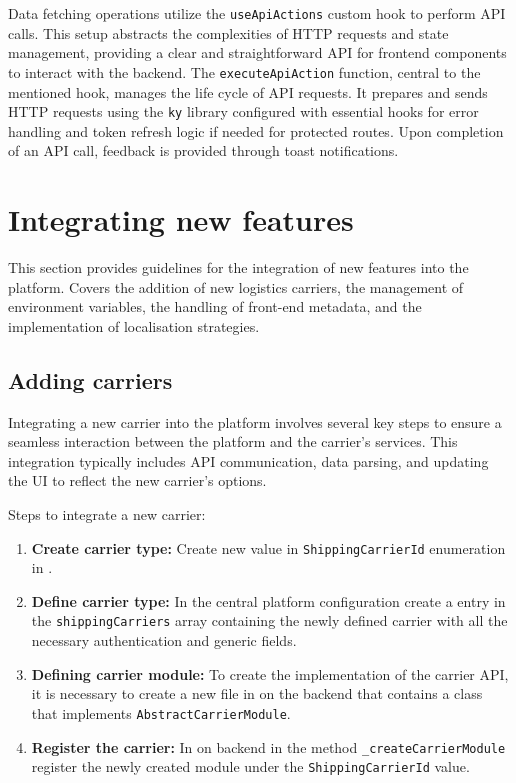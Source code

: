 Data fetching operations utilize the \texttt{useApiActions} custom hook to perform API calls. 
This setup abstracts the complexities of HTTP requests and state management, providing a clear and straightforward API for frontend components to interact with the backend.
The \texttt{executeApiAction} function, central to the mentioned hook, manages the life cycle of API requests. It prepares and sends HTTP requests using the \texttt{ky} library configured with essential hooks for error handling and token refresh logic if needed for protected routes.
Upon completion of an API call, feedback is provided through toast notifications.

\section{Integrating new features}
\label{attachments:programming-platform.integrating}
This section provides guidelines for the integration of new features into the platform. 
Covers the addition of new logistics carriers, the management of environment variables, the handling of front-end metadata, and the implementation of localisation strategies.

\subsection{Adding carriers}
Integrating a new carrier into the platform involves several key steps to ensure a seamless interaction between the platform and the carrier's services. 
This integration typically includes API communication, data parsing, and updating the UI to reflect the new carrier's options.

Steps to integrate a new carrier:
\begin{enumerate}
    \item \textbf{Create carrier type:} Create new value in \texttt{ShippingCarrierId} enumeration in .
    \item \textbf{Define carrier type:} In the central platform configuration  create a entry in the \texttt{shippingCarriers} array containing the newly defined carrier with all the necessary authentication and generic fields.
    \item \textbf{Defining carrier module:} To create the implementation of the carrier API, it is necessary to create a new file in  on the backend that contains a class that implements \texttt{AbstractCarrierModule}.
    \item \textbf{Register the carrier:} In  on backend in the method \texttt{\_createCarrierModule} register the newly created module under the \texttt{ShippingCarrierId} value.
\end{enumerate}

